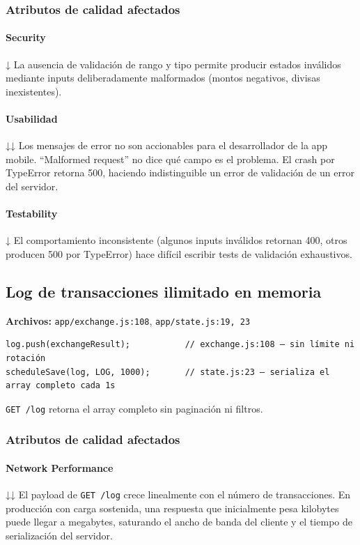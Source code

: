 \subsubsection{Atributos de calidad afectados}

\paragraph{Security} ↓ La ausencia de validación de rango y tipo permite producir estados inválidos mediante inputs deliberadamente malformados (montos negativos, divisas inexistentes).

\paragraph{Usabilidad} ↓↓ Los mensajes de error no son accionables para el desarrollador de la app mobile. ``Malformed request'' no dice qué campo es el problema. El crash por TypeError retorna 500, haciendo indistinguible un error de validación de un error del servidor.

\paragraph{Testability} ↓ El comportamiento inconsistente (algunos inputs inválidos retornan 400, otros producen 500 por TypeError) hace difícil escribir tests de validación exhaustivos.

\subsection{Log de transacciones ilimitado en memoria}

\textbf{Archivos:} \texttt{app/exchange.js:108}, \texttt{app/state.js:19, 23}

\begin{verbatim}
log.push(exchangeResult);           // exchange.js:108 — sin límite ni rotación
scheduleSave(log, LOG, 1000);       // state.js:23 — serializa el array completo cada 1s
\end{verbatim}
\texttt{GET /log} retorna el array completo sin paginación ni filtros.


\subsubsection{Atributos de calidad afectados}

\paragraph{Network Performance} ↓↓ El payload de \texttt{GET /log} crece linealmente con el número de transacciones. En producción con carga sostenida, una respuesta que inicialmente pesa kilobytes puede llegar a megabytes, saturando el ancho de banda del cliente y el tiempo de serialización del servidor.

